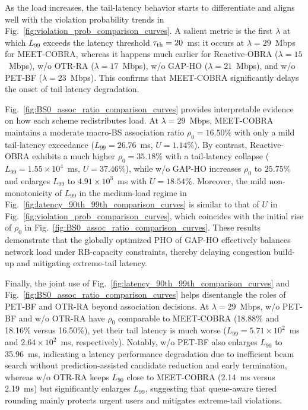 \documentclass[conference, a4paper]{IEEEtran}
\theoremstyle{remark}
\begin{document}
As the load increases, the tail-latency behavior starts to differentiate and aligns well with the violation probability trends in Fig.~\ref{fig:violation_prob_comparison_curves}.
A salient metric is the first $\lambda$ at which $L_{99}$ exceeds the latency threshold $\tau_{\rm th}=20$~ms:
it occurs at $\lambda=29$~Mbps for MEET-COBRA, 
whereas it happens much earlier for Reactive-OBRA ($\lambda=15$~Mbps), {w/o OTR-RA} ($\lambda=17$~Mbps), {w/o GAP-HO} ($\lambda=21$~Mbps), and {w/o PET-BF} ($\lambda=23$~Mbps).
This confirms that MEET-COBRA significantly delays the onset of tail latency degradation.

Fig.~\ref{fig:BS0_assoc_ratio_comparison_curves} provides interpretable evidence on how each scheme redistributes load. At $\lambda=29$~Mbps, MEET-COBRA maintains a moderate macro-BS association ratio $\rho_{0}=16.50\%$ with only a mild tail-latency exceedance ($L_{99}=26.76$~ms, $U=1.14\%$). By contrast, Reactive-OBRA exhibits a much higher $\rho_{0}=35.18\%$ with a tail-latency collapse ($L_{99}=1.55\times 10^{4}$~ms, $U=37.46\%$), while w/o GAP-HO increases $\rho_{0}$ to $25.75\%$ and enlarges $L_{99}$ to $4.91\times 10^{3}$~ms with $U=18.54\%$. 
Moreover, the mild non-monotonicity of $L_{99}$ in the medium-load regime in Fig.~\ref{fig:latency_90th_99th_comparison_curves} is similar to that of $U$ in Fig.~\ref{fig:violation_prob_comparison_curves}, which coincides with the initial rise of $\rho_0$ in Fig.~\ref{fig:BS0_assoc_ratio_comparison_curves}. 
These results demonstrate that the globally optimized PHO of GAP-HO effectively balances network load under RB-capacity constraints, thereby delaying congestion build-up and mitigating extreme-tail latency.


Finally, the joint use of Fig.~\ref{fig:latency_90th_99th_comparison_curves} and Fig.~\ref{fig:BS0_assoc_ratio_comparison_curves} helps disentangle the roles of PET-BF and OTR-RA {beyond} association decisions.
At $\lambda=29$~Mbps, {w/o PET-BF} and {w/o OTR-RA} have $\rho_{0}$ comparable to MEET-COBRA (18.88\% and 18.16\% versus 16.50\%), yet their tail latency is much worse ($L_{99}=5.71\times 10^{2}$~ms and $2.64\times 10^{2}$~ms, respectively).
Notably, {w/o PET-BF} also enlarges $L_{90}$ to 35.96~ms, indicating a latency performance degradation due to inefficient beam search without prediction-assisted candidate reduction and early termination,
whereas {w/o OTR-RA} keeps $L_{90}$ close to MEET-COBRA (2.14~ms versus 2.19~ms) but significantly enlarges $L_{99}$, suggesting that queue-aware tiered rounding mainly protects urgent users and mitigates extreme-tail violations.
\end{document}

